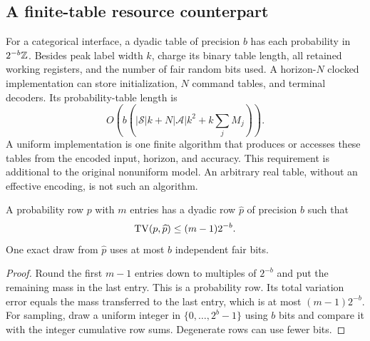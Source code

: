 \subsection{A finite-table resource counterpart}
For a categorical interface, a dyadic table of precision $b$ has each probability in $2^{-b}\mathbb Z$. Besides peak label width $k$, charge its binary table length, all retained working registers, and the number of fair random bits used. A horizon-$N$ clocked implementation can store initialization, $N$ command tables, and terminal decoders. Its probability-table length is
\[
 O\left(b\left(|\mathcal S|k+N|\mathcal A|k^2+
                                k\sum_jM_j\right)\right).
\]
A uniform implementation is one finite algorithm that produces or accesses these tables from the encoded input, horizon, and accuracy. This requirement is additional to the original nonuniform model. An arbitrary real table, without an effective encoding, is not such an algorithm.

\begin{lemma}\label{lem:dyadic56}
A probability row $p$ with $m$ entries has a dyadic row $\widehat p$ of precision $b$ such that
\[
                   \operatorname{TV}(p,\widehat p)\le(m-1)2^{-b}.
\]
One exact draw from $\widehat p$ uses at most $b$ independent fair bits.
\end{lemma}
\begin{proof}
Round the first $m-1$ entries down to multiples of $2^{-b}$ and put the remaining mass in the last entry. This is a probability row. Its total variation error equals the mass transferred to the last entry, which is at most $(m-1)2^{-b}$. For sampling, draw a uniform integer in $\{0,\ldots,2^b-1\}$ using $b$ bits and compare it with the integer cumulative row sums. Degenerate rows can use fewer bits.
\end{proof}

